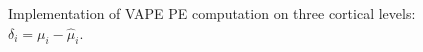 \begin{figure}
  \centering

  \small

  \newcommand{\w}[1]{\textcolor{white}{#1}}
  \def\svgwidth{0.9\textwidth}


  \caption{Implementation of \textsf{VAPE} PE computation on three cortical levels: $\delta_i = \mu_i - \hat{\mu}_i$.}
  \label{\figlabel}
\end{figure}
